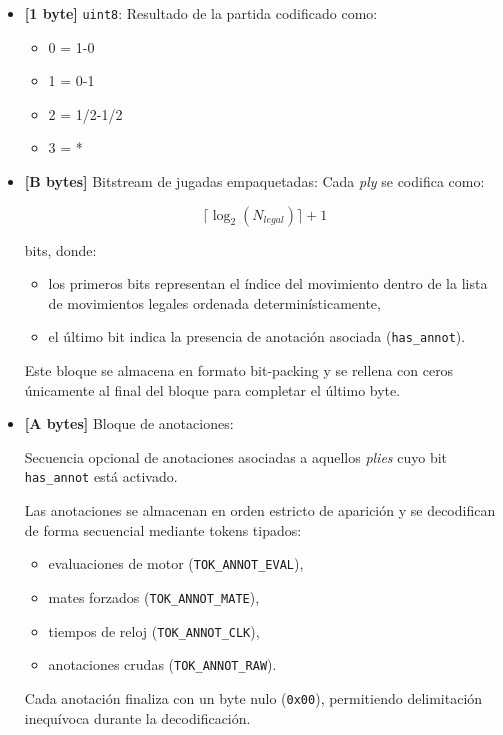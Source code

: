 \documentclass[11pt, letterpaper]{article}
\begin{document}
\begin{tcolorbox}[breakable, colback=gray!10, colframe=black]
\begin{itemize}
\begin{itemize}
\begin{itemize}
        \item \textbf{[1 byte]} \texttt{uint8}:
        Resultado de la partida codificado como:
        \begin{itemize}
            \item 0 = 1-0
            \item 1 = 0-1
            \item 2 = 1/2-1/2
            \item 3 = *
        \end{itemize}

        \item \textbf{[B bytes]} Bitstream de jugadas empaquetadas:
        Cada \textit{ply} se codifica como:

        \[
        \lceil \log_2(N_{legal}) \rceil + 1
        \]

        bits, donde:
        \begin{itemize}
            \item los primeros bits representan el índice del movimiento dentro de la lista de movimientos legales ordenada determinísticamente,
            \item el último bit indica la presencia de anotación asociada (\texttt{has\_annot}).
        \end{itemize}

        Este bloque se almacena en formato bit-packing y se rellena con ceros únicamente al final del bloque para completar el último byte.

        \item \textbf{[A bytes]} Bloque de anotaciones:

        Secuencia opcional de anotaciones asociadas a aquellos \textit{plies} cuyo bit \texttt{has\_annot} está activado.

        Las anotaciones se almacenan en orden estricto de aparición y se decodifican de forma secuencial mediante tokens tipados:

        \begin{itemize}
            \item evaluaciones de motor (\texttt{TOK\_ANNOT\_EVAL}),
            \item mates forzados (\texttt{TOK\_ANNOT\_MATE}),
            \item tiempos de reloj (\texttt{TOK\_ANNOT\_CLK}),
            \item anotaciones crudas (\texttt{TOK\_ANNOT\_RAW}).
        \end{itemize}

        Cada anotación finaliza con un byte nulo (\texttt{0x00}), permitiendo delimitación inequívoca durante la decodificación.

    \end{itemize}

\end{itemize}

\end{itemize}
\end{tcolorbox}
\end{document}
